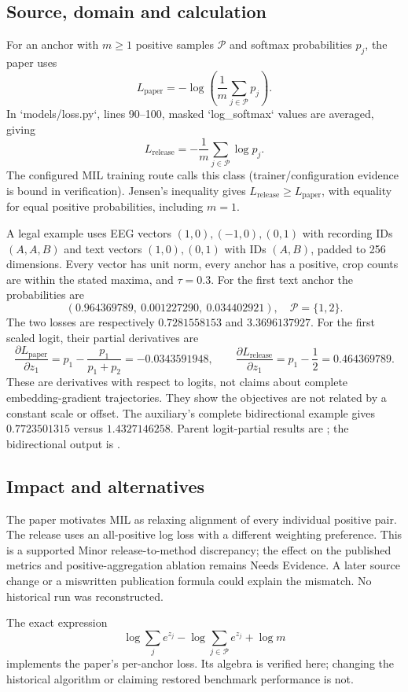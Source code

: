 \documentclass[10pt]{article}
\begin{document}
\subsection*{Source, domain and calculation}
For an anchor with \(m\geq1\) positive samples \(\mathcal P\) and softmax probabilities \(p_j\), the paper uses \[L_{\mathrm{paper}}
=-\log\left(\frac1m\sum_{j\in\mathcal P}p_j\right).\] In `models/loss.py`, lines 90–100, masked `log\_softmax` values are averaged, giving \[L_{\mathrm{release}}=-\frac1m\sum_{j\in\mathcal P}\log p_j.\] The configured MIL training route calls this class (trainer/configuration evidence is bound in verification). Jensen’s inequality gives \(L_{\mathrm{release}}\geq L_{\mathrm{paper}}\), with equality for equal positive probabilities, including \(m=1\).\par
A legal example uses EEG vectors \((1,0),(-1,0),(0,1)\) with recording IDs \((A,A,B)\) and text vectors \((1,0),(0,1)\) with IDs \((A,B)\), padded to 256 dimensions. Every vector has unit norm, every anchor has a positive, crop counts are within the stated maxima, and \(\tau=0.3\). For the first text anchor the probabilities are \[(0.964369789,\ 0.001227290,\ 0.034402921),
\quad\mathcal P=\{1,2\}.\] The two losses are respectively \(0.7281558153\) and \(3.3696137927\). For the first scaled logit, their partial derivatives are \[\frac{\partial L_{\mathrm{paper}}}{\partial z_1}
=p_1-\frac{p_1}{p_1+p_2}=-0.0343591948,\qquad
\frac{\partial L_{\mathrm{release}}}{\partial z_1}
=p_1-\frac12=0.464369789.\] These are derivatives with respect to logits, not claims about complete embedding-gradient trajectories. They show the objectives are not related by a constant scale or offset. The auxiliary’s complete bidirectional example gives \(0.7723501315\) versus \(1.4327146258\). Parent logit-partial results are ; the bidirectional output is .\par
\subsection*{Impact and alternatives}
The paper motivates MIL as relaxing alignment of every individual positive pair. The release uses an all-positive log loss with a different weighting preference. This is a supported Minor release-to-method discrepancy; the effect on the published metrics and positive-aggregation ablation remains Needs Evidence. A later source change or a miswritten publication formula could explain the mismatch. No historical run was reconstructed.\par
The exact expression \[\log\sum_j e^{z_j}-\log\sum_{j\in\mathcal P}e^{z_j}+\log m\] implements the paper’s per-anchor loss. Its algebra is verified here; changing the historical algorithm or claiming restored benchmark performance is not.\par
\end{document}
